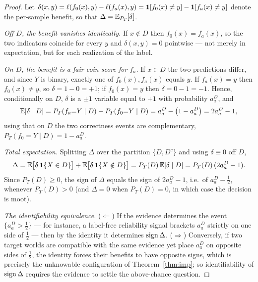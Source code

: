 \begin{proof}
Let $\delta(x,y)=\ell(f_0(x),y)-\ell(f_a(x),y)=\mathbf{1}[f_0(x)\neq y]-\mathbf{1}[f_a(x)\neq y]$
denote the per-sample benefit, so that $\Delta=\mathbb{E}_{P_T}[\delta]$.

\emph{Off $D$, the benefit vanishes identically.} If $x\notin D$ then
$f_0(x)=f_a(x)$, so the two indicators coincide for every $y$ and $\delta(x,y)=0$
pointwise --- not merely in expectation, but for each realization of the label.

\emph{On $D$, the benefit is a fair-coin score for $f_a$.} If $x\in D$ the two
predictions differ, and since $Y$ is binary, exactly one of $f_0(x),f_a(x)$ equals
$y$. If $f_a(x)=y$ then $f_0(x)\neq y$, so $\delta=1-0=+1$; if $f_0(x)=y$ then
$\delta=0-1=-1$. Hence, conditionally on $D$, $\delta$ is a $\pm1$ variable equal to
$+1$ with probability $a_a^D$, and
\[
\mathbb{E}[\delta\mid D]
=P_T(f_a{=}Y\mid D)-P_T(f_0{=}Y\mid D)
=a_a^D-\bigl(1-a_a^D\bigr)
=2a_a^D-1 ,
\]
using that on $D$ the two correctness events are complementary,
$P_T(f_0{=}Y\mid D)=1-a_a^D$.

\emph{Total expectation.} Splitting $\Delta$ over the partition $\{D,D^c\}$ and using
$\delta\equiv0$ off $D$,
\[
\Delta=\mathbb{E}\bigl[\delta\,\mathbf{1}\{X\in D\}\bigr]+\mathbb{E}\bigl[\delta\,\mathbf{1}\{X\notin D\}\bigr]
=P_T(D)\,\mathbb{E}[\delta\mid D]
=P_T(D)\,(2a_a^D-1).
\]
Since $P_T(D)\ge0$, the sign of $\Delta$ equals the sign of $2a_a^D-1$, i.e.\ of
$a_a^D-\tfrac12$, whenever $P_T(D)>0$ (and $\Delta=0$ when $P_T(D)=0$, in which case
the decision is moot).

\emph{The identifiability equivalence.} ($\Leftarrow$) If the evidence determines the
event $\{a_a^D>\tfrac12\}$ --- for instance, a label-free reliability signal brackets
$a_a^D$ strictly on one side of $\tfrac12$ --- then by the identity it determines
$\operatorname{sign}\Delta$. ($\Rightarrow$) Conversely, if two target worlds are compatible with the
same evidence yet place $a_a^D$ on opposite sides of $\tfrac12$, the identity forces
their benefits to have opposite signs, which is precisely the unknowable configuration
of Theorem~\ref{thm:imp}; so identifiability of $\operatorname{sign}\Delta$ requires the evidence to
settle the above-chance question. \qedhere
\end{proof}

